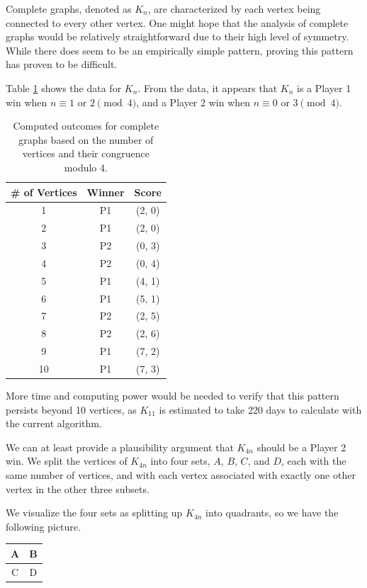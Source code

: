\documentclass{article}
\begin{document}
Complete graphs, denoted as $K_n$, are characterized by each vertex being connected to every other vertex. One might hope that the analysis of complete graphs would be relatively straightforward due to their high level of symmetry. While there does seem to be an empirically simple pattern, proving this pattern has proven to be difficult.

Table \ref{table:complete-graph-outcomes} shows the data for $K_n$. From the data, it appears that $K_n$ is a Player 1 win when $n \equiv 1$ or $2 \pmod{4}$, and a Player 2 win when $n \equiv 0$ or $3 \pmod{4}$.


\begin{table}[hbt!]
\centering
\begin{tabular}{|c|c|c|}
\hline
\textbf{\# of Vertices} & \textbf{Winner} & \textbf{Score} \\
\hline
1 & P1 & (2, 0) \\
2 & P1 & (2, 0) \\
3 & P2 & (0, 3) \\
4 & P2 & (0, 4) \\
5 & P1 & (4, 1) \\
6 & P1 & (5, 1) \\
7 & P2 & (2, 5) \\
8 & P2 & (2, 6) \\
9 & P1 & (7, 2) \\
10 & P1 & (7, 3) \\
\hline
\end{tabular}
\caption{Computed outcomes for complete graphs based on the number of vertices and their congruence modulo 4.}
\label{table:complete-graph-outcomes}
\end{table}
\FloatBarrier 

More time and computing power would be needed to verify that this pattern persists beyond 10 vertices, as $K_{11}$ is estimated to take 220 days to calculate with the current algorithm.

We can at least provide a plausibility argument that $K_{4n}$ should be a Player 2 win. We split the vertices of $K_{4n}$ into four sets, $A$, $B$, $C$, and $D$, each with the same number of vertices, and with each vertex associated with exactly one other vertex in the other three subsets.

We visualize the four sets as splitting up $K_{4n}$ into quadrants, so we have the following picture.
\begin{table}[htbp]
\centering
\begin{tabular}{c|c}
A & B \\
\hline
C & D  
\end{tabular}
\label{table:quadrant-visualization}
\end{table}
\FloatBarrier
\end{document}
